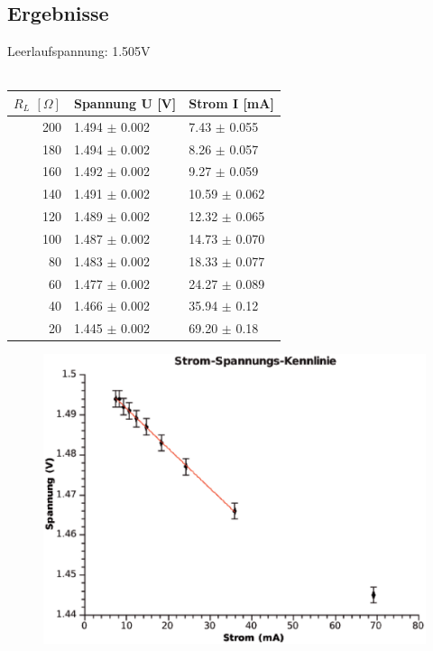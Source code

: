 \documentclass{article}
\begin{document}
\newpage
\subsection{Ergebnisse}
Leerlaufspannung: 1.505V\\
\\


\begin{tabular}{|r|l|l|}
\hline
$R_L$ $[\Omega]$ & Spannung U [V] & Strom I [mA]\\
\hline
200 & 1.494 $\pm$ 0.002 & 7.43 $\pm$ 0.055\\
180 & 1.494 $\pm$ 0.002 & 8.26 $\pm$ 0.057\\
160 & 1.492 $\pm$ 0.002 & 9.27 $\pm$ 0.059\\
140 & 1.491 $\pm$ 0.002 & 10.59 $\pm$ 0.062\\
120 & 1.489 $\pm$ 0.002 & 12.32 $\pm$ 0.065\\
100 & 1.487 $\pm$ 0.002 & 14.73 $\pm$ 0.070\\
80 & 1.483 $\pm$ 0.002 & 18.33 $\pm$ 0.077\\
60 & 1.477 $\pm$ 0.002 & 24.27 $\pm$ 0.089\\
40 & 1.466 $\pm$ 0.002 & 35.94 $\pm$ 0.12\\
20 & 1.445 $\pm$ 0.002 & 69.20 $\pm$ 0.18\\
\hline
\end{tabular}


\begin{center}
\begin{figure}[H]
\includegraphics[scale=0.5]{batterie_kennlinie.eps} 
\end{figure}
\end{center}
\end{document}
